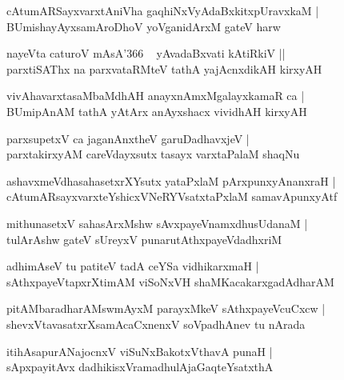 \documentclass[twoside,12pt,openright]{book}
\newcounter{shloka}[chapter]
\begin{document}
\begin{shloka}%
cAtumARSayxvarxtAniVha gaqhiNxVyAdaBxkitxpUravxkaM |\\
BUmishayAyxsamAroDhoV yoVganidArxM gateV harw
\end{shloka}

\begin{shloka}%
nayeVta caturoV mAsA\char'366 ~ yAvadaBxvati kAtiRkiV ||\\
parxtiSAThx na parxvataRMteV tathA yajAcnxdikAH kirxyAH 
\end{shloka}

\begin{shloka}%
vivAhavarxtasaMbaMdhAH anayxnAmxMgalayxkamaR ca |\\
BUmipAnAM tathA yAtArx anAyxshacx vividhAH kirxyAH
\end{shloka}

\begin{shloka}%
parxsupetxV ca jaganAnxtheV garuDadhavxjeV |\\
parxtakirxyAM careVdayxsutx tasayx varxtaPalaM shaqNu
\end{shloka}

\begin{shloka}%
ashavxmeVdhasahasetxrXYsutx yataPxlaM pArxpunxyAnanxraH |\\
cAtumARsayxvarxteYshicxVNeRYVsatxtaPxlaM samavApunxyAtf
\end{shloka}

\begin{shloka}%
mithunasetxV sahasArxMshw sAvxpayeVnamxdhusUdanaM |\\
tulArAshw gateV sUreyxV punarutAthxpayeVdadhxriM
\end{shloka}

\begin{shloka}%
adhimAseV tu patiteV tadA ceYSa vidhikarxmaH |\\
sAthxpayeVtapxrXtimAM viSoNxVH shaMKacakarxgadAdharAM 
\end{shloka}

\begin{shloka}%
pitAMbaradharAMswmAyxM parayxMkeV sAthxpayeVcuCxcw |\\
shevxVtavasatxrXsamAcaCxnenxV soVpadhAnev tu nArada
\end{shloka}

\begin{shloka}%
itihAsapurANajocnxV viSuNxBakotxVthavA punaH |\\
sApxpayitAvx dadhikisxVramadhulAjaGaqteYsatxthA 
\end{shloka}
\end{document}
